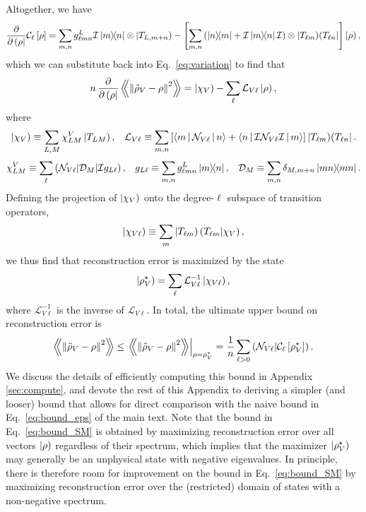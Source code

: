 \documentclass[notitlepage,twocolumn]{revtex4-2}
\newcommand{\f}[2]{\dfrac{#1}{#2}} %
\newcommand{\p}[1]{\left(#1\right)} %
\renewcommand{\sp}[1]{\left[#1\right]} %
\newcommand{\bk}{\Braket} %
\newcommand{\Bbk}[1]
{\left\langle\!\!\left\langle #1 \right\rangle\!\!\right\rangle}
\newcommand{\C}{\mathcal{C}}
\newcommand{\D}{\mathcal{D}}
\newcommand{\I}{\mathcal{I}}
\renewcommand{\L}{\mathcal{L}}
\newcommand{\N}{\mathcal{N}}
\def\obra#1{\mathinner{({#1}|}}
\def\oket#1{\mathinner{|{#1})}}
\def\obk#1{\mathinner{({#1})}}
\def\oop#1#2{\oket{#1}\!\obra{#2}}
\begin{document}
Altogether, we have
\begin{align}
  \f{\partial}{\partial\obra\rho} \C_\ell\sp{\rho}
  = \sum_{m,n} g_{\ell mn}^L \I\op{m}{n} \otimes \oket{T_{L,m+n}}
  - \sp{\sum_{m,n} \p{\op{n}{m} + \I\op{m}{n}\I}
    \otimes \oop{T_{\ell m}}{T_{\ell n}}} \oket{\rho},
\end{align}
which we can substitute back into Eq.~\eqref{eq:variation} to find that
\begin{align}
  n\, \f{\partial}{\partial\obra\rho}
  \Bbk{\norm{\tilde\rho_V-\rho}^2}
  = \oket{\chi_V} - \sum_\ell \L_{V\ell} \oket\rho,
\end{align}
where
\begin{align}
  \oket{\chi_V} \equiv \sum_{L,M} \chi^V_{LM} \oket{T_{LM}},
  &&
  \L_{V\ell} \equiv \sum_{m,n}
  \sp{\bk{m|\N_{V\ell}|n} + \bk{n|\I\N_{V\ell}\I|m}}
  \oop{T_{\ell m}}{T_{\ell n}}.
\end{align}
\begin{align}
  \chi^V_{LM} \equiv \sum_\ell \obk{\N_{V\ell}|\D_M|\I g_{L\ell}},
  &&
  g_{L\ell} \equiv \sum_{m,n} g^L_{\ell mn} \op{m}{n},
  &&
  \D_M \equiv \sum_{m,n} \delta_{M,m+n} \op{mn}{mn}.
\end{align}
Defining the projection of $\oket{\chi_V}$ onto the degree-$\ell$ subspace of transition operators,
\begin{align}
  \oket{\chi_{V\ell}}
  \equiv \sum_m \oket{T_{\ell m}} \obk{T_{\ell m}|\chi_V},
\end{align}
we thus find that reconstruction error is maximized by the state
\begin{align}
  \oket{\rho_V^\star} = \sum_\ell \L_{V\ell}^{-1} \oket{\chi_{V\ell}},
\end{align}
where $\L_{V\ell}^{-1}$ is the inverse of $\L_{V\ell}$.
In total, the ultimate upper bound on reconstruction error is
\begin{align}
  \Bbk{\norm{\tilde\rho_V-\rho}^2} \le
  \left. \Bbk{\norm{\tilde\rho_V-\rho}^2} \right|_{\rho=\rho_V^\star}
  = \f1n \sum_{\ell>0} \obk{\N_{V\ell}|\C_\ell\sp{\rho_V^\star}}.
  \label{eq:bound_SM}
\end{align}
We discuss the details of efficiently computing this bound in Appendix \ref{sec:compute}, and devote the rest of this Appendix to deriving a simpler (and looser) bound that allows for direct comparison with the naive bound in Eq.~\eqref{eq:bound_eps} of the main text.
Note that the bound in Eq.~\eqref{eq:bound_SM} is obtained by maximizing reconstruction error over all vectors $\oket\rho$ regardless of their spectrum, which implies that the maximizer $\oket{\rho_V^\star}$ may generally be an unphysical state with negative eigenvalues.
In principle, there is therefore room for improvement on the bound in Eq.~\eqref{eq:bound_SM} by maximizing reconstruction error over the (restricted) domain of states with a non-negative spectrum.
\end{document}
